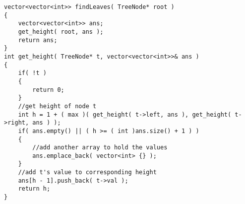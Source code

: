 \setcounter{lstlisting}{0}
\begin{lstlisting}[style=customc, caption={DFS}]
vector<vector<int>> findLeaves( TreeNode* root )
{
    vector<vector<int>> ans;
    get_height( root, ans );
    return ans;
}
int get_height( TreeNode* t, vector<vector<int>>& ans )
{
    if( !t )
    {
        return 0;
    }
    //get height of node t
    int h = 1 + ( max )( get_height( t->left, ans ), get_height( t->right, ans ) );
    if( ans.empty() || ( h >= ( int )ans.size() + 1 ) )
    {
        //add another array to hold the values
        ans.emplace_back( vector<int> {} );
    }
    //add t's value to corresponding height
    ans[h - 1].push_back( t->val );
    return h;
}
\end{lstlisting}

